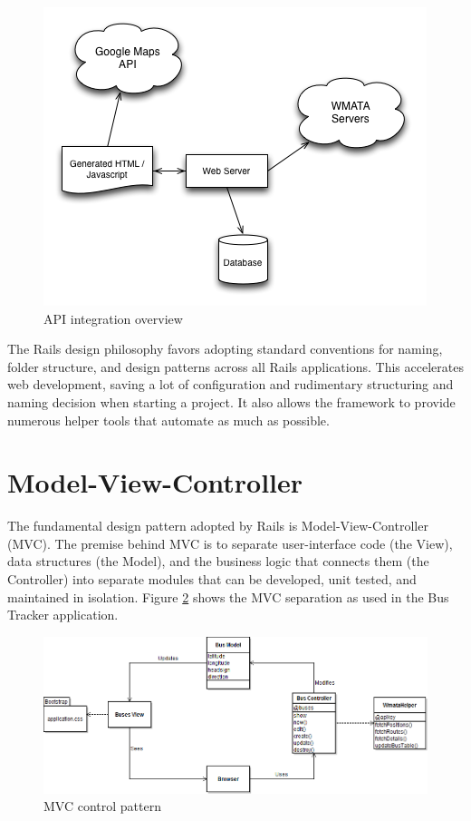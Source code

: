 \documentclass[12pt]{report}
\begin{document}
\begin{figure}[ht]
  \centerline{\includegraphics[scale=0.6]{design.png}}
  \caption{API integration overview}
  \label{fig:designOverview}
\end{figure}

The Rails design philosophy favors adopting standard conventions for naming, folder structure, and design patterns across all Rails applications.   This accelerates web development, saving a lot of configuration and rudimentary structuring and naming decision when starting a project.  It also allows the framework to provide numerous helper tools that automate as much as possible.


\section{Model-View-Controller}
The fundamental design pattern adopted by Rails is Model-View-Controller (MVC).  The premise behind MVC is to separate user-interface code (the View), data structures (the Model), and the business logic that connects them (the Controller) into separate modules that can be developed, unit tested, and maintained in isolation.  Figure \ref{fig:MVC} shows the MVC separation as used in the Bus Tracker application.

\begin{figure}[ht]
  \centerline{\includegraphics[width=\textwidth]{busTrackerUML.png}}
  \caption{MVC control pattern}
  \label{fig:MVC}
\end{figure}
\end{document}
